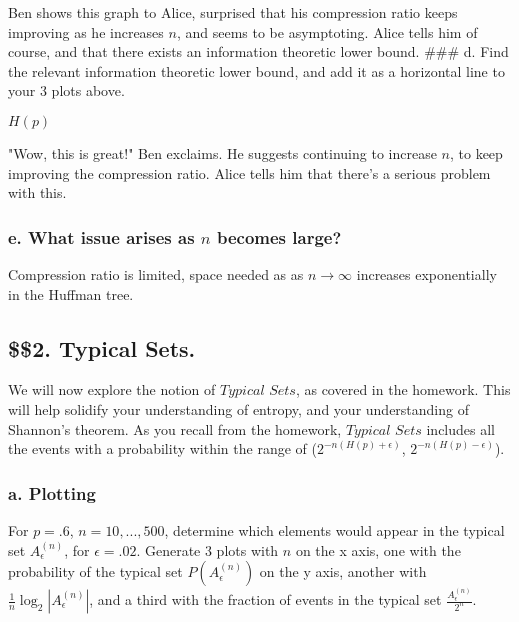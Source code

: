 \documentclass[11pt]{article}
\begin{document}
    Ben shows this graph to Alice, surprised that his compression ratio
keeps improving as he increases \(n\), and seems to be asymptoting.
Alice tells him of course, and that there exists an information
theoretic lower bound. \#\#\# d. Find the relevant information theoretic
lower bound, and add it as a horizontal line to your 3 plots above.

    \(H(p)\)

    "Wow, this is great!" Ben exclaims. He suggests continuing to increase
\(n\), to keep improving the compression ratio. Alice tells him that
there's a serious problem with this.

\subsubsection{\texorpdfstring{e. What issue arises as \(n\) becomes
large?}{e. What issue arises as n becomes large?}}\label{e.-what-issue-arises-as-n-becomes-large}

    Compression ratio is limited, space needed as as \(n \to \infty\)
increases exponentially in the Huffman tree.

    \subsection{\texorpdfstring{\$\$2. Typical
Sets.}{\$\$2. Typical Sets.}}\label{typical-sets.}

We will now explore the notion of \(\textit{Typical Sets}\), as covered
in the homework. This will help solidify your understanding of entropy,
and your understanding of Shannon's theorem. As you recall from the
homework, \(\textit{Typical Sets}\) includes all the events with a
probability within the range of (\(2^{-n(H(p) + \epsilon)}\),
\(2^{-n(H(p) - \epsilon)}\)).

\subsubsection{ a. Plotting}\label{a.-plotting}

For \(p=.6\), \(n=10,...,500\), determine which elements would appear in
the typical set \(A_\epsilon^{(n)}\), for \(\epsilon = .02\). Generate 3
plots with \(n\) on the x axis, one with the probability of the typical
set \(P(A_\epsilon^{(n)})\) on the y axis, another with
\(\frac{1}{n} \log_2 |A_\epsilon^{(n)}|\), and a third with the fraction
of events in the typical set \(\frac{A_\epsilon^{(n)}}{2^n}\).
\end{document}
